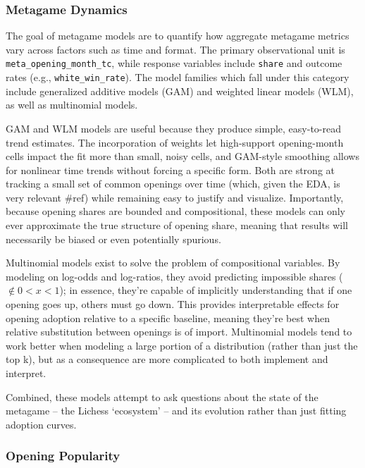 \documentclass[
  12pt]{article}
\begin{document}
\subsubsection{Metagame Dynamics}\label{sec-metagame-dynamics}

The goal of metagame models are to quantify how aggregate metagame
metrics vary across factors such as time and format. The primary
observational unit is \texttt{meta\_opening\_month\_tc}, while response
variables include \texttt{share} and outcome rates (e.g.,
\texttt{white\_win\_rate}). The model families which fall under this
category include generalized additive models (GAM) and weighted linear
models (WLM), as well as multinomial models.

GAM and WLM models are useful because they produce simple, easy-to-read
trend estimates. The incorporation of weights let high-support
opening-month cells impact the fit more than small, noisy cells, and
GAM-style smoothing allows for nonlinear time trends without forcing a
specific form. Both are strong at tracking a small set of common
openings over time (which, given the EDA, is very relevant \#ref) while
remaining easy to justify and visualize. Importantly, because opening
shares are bounded and compositional, these models can only ever
approximate the true structure of opening share, meaning that results
will necessarily be biased or even potentially spurious.

Multinomial models exist to solve the problem of compositional
variables. By modeling on log-odds and log-ratios, they avoid predicting
impossible shares (\(\notin 0 < x < 1\)); in essence, they're capable of
implicitly understanding that if one opening goes up, others must go
down. This provides interpretable effects for opening adoption relative
to a specific baseline, meaning they're best when relative substitution
between openings is of import. Multinomial models tend to work better
when modeling a large portion of a distribution (rather than just the
top k), but as a consequence are more complicated to both implement and
interpret.

Combined, these models attempt to ask questions about the state of the
metagame -- the Lichess `ecosystem' -- and its evolution rather than
just fitting adoption curves.

\subsubsection{Opening Popularity}\label{opening-popularity}
\end{document}
